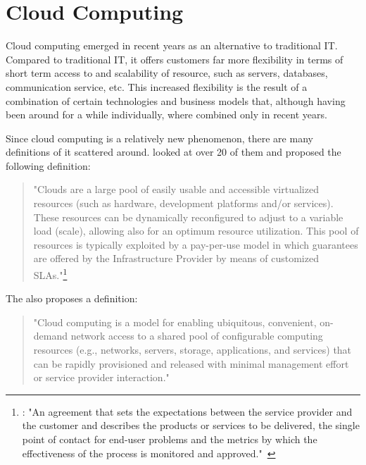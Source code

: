 \section{Cloud Computing}

Cloud computing emerged in recent years as an alternative to traditional IT.
Compared to traditional IT, it offers customers far more flexibility in terms of short term access to and scalability of resource, such as servers, databases, communication service, etc.
This increased flexibility is the result of a combination of certain technologies and business models that, although having been around for a while individually, where combined only in recent years.

Since cloud computing is a relatively new phenomenon, there are many definitions of it scattered around. \citeauthor{cloud:def:towards} looked at over 20 of them and proposed the following definition:

\begin{quote}
	"Clouds are a large pool of easily usable and accessible virtualized resources (such as hardware, development platforms and/or services). These resources can be dynamically reconfigured to adjust to a variable load (scale), allowing also for an optimum resource utilization. This pool of resources is typically exploited by a pay-per-use model in which guarantees are offered by the Infrastructure Provider by means of customized SLAs."\footnote{: "An agreement that sets the expectations between the service provider and the customer and describes the products or services to be delivered, the single point of contact for end-user problems and the metrics by which the effectiveness of the process is monitored and approved."~\autocite{def:sla}}~\autocite{cloud:def:towards}
\end{quote}

The  also proposes a definition:

\begin{quote}
	"Cloud computing is a model for enabling ubiquitous, convenient, on-demand network access to a shared pool of configurable computing resources (e.g., networks, servers, storage, applications, and services) that can be rapidly provisioned and released with minimal management effort or service provider interaction."~\autocite{cloud:def:nist}
\end{quote}

